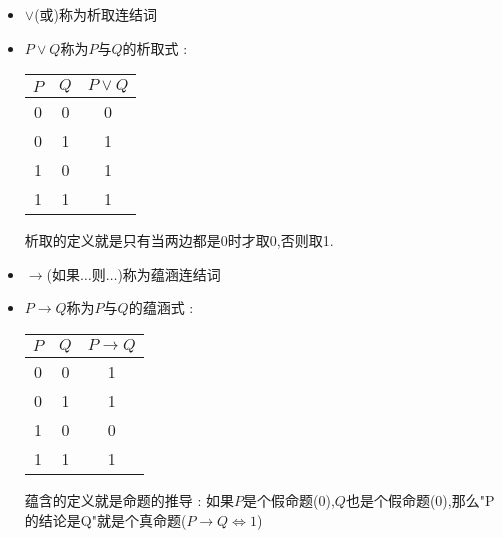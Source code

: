{{{\begin{itemize}
{            合取的定义就是只有当两边都是1的时候才取1.

            注意左边两列,可以当成二进制读出"0","1","2","3",此表称为真值表.

            构造真值表的方法就是将所有命题列出,每个命题一列,当有$n$个命题时就会有$2^n$行,从左往右第一个命题二分,一半是0一半是1,第二列在第一列的基础上再次二分$\dots$,如此就能写出所有取值.
            }
      \item $\lor$(或)称为析取连结词
      \item {
            $P \lor Q$称为$P$与$Q$的析取式 :

            \begin{center}
              \begin{tabular}{c|c|c}
                \hline
                $P$ & $Q$ & $P \lor Q$ \\
                \hline
                0   & 0   & 0          \\
                0   & 1   & 1          \\
                1   & 0   & 1          \\
                1   & 1   & 1          \\
                \hline
              \end{tabular}
            \end{center}

            析取的定义就是只有当两边都是0时才取0,否则取1.
            }
      \item $\to$(如果$\dots$则$\dots$)称为蕴涵连结词
      \item {
            $P \to Q$称为$P$与$Q$的蕴涵式 :

            \begin{center}
              \begin{tabular}{c|c|c}
                \hline
                $P$ & $Q$ & $P \to Q$ \\
                \hline
                0   & 0   & 1         \\
                0   & 1   & 1         \\
                1   & 0   & 0         \\
                1   & 1   & 1         \\
              \end{tabular}
            \end{center}

            蕴含的定义就是命题的推导 : 如果$P$是个假命题(0),$Q$也是个假命题(0),那么"P的结论是Q"就是个真命题($P \to Q \Leftrightarrow 1$)

}
\end{itemize}}}}
